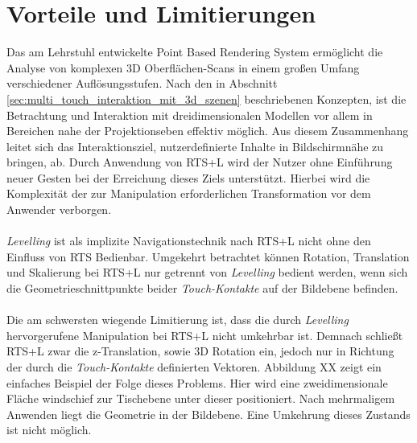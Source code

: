 \section{Vorteile und Limitierungen}
\label{sec:vorteile_und_limitierungen_implizit}

Das am Lehrstuhl entwickelte Point Based Rendering  System ermöglicht die Analyse von komplexen 3D Oberflächen-Scans in einem großen Umfang verschiedener Auflösungsstufen. Nach den in Abschnitt \ref{sec:multi_touch_interaktion_mit_3d_szenen} beschriebenen Konzepten, ist die Betrachtung und Interaktion mit dreidimensionalen Modellen vor allem in Bereichen nahe der Projektionseben effektiv möglich. Aus diesem Zusammenhang leitet sich das Interaktionsziel, nutzerdefinierte Inhalte in Bildschirmnähe zu bringen, ab. Durch Anwendung von RTS+L wird der Nutzer ohne Einführung neuer Gesten bei der Erreichung dieses Ziels unterstützt. Hierbei wird die Komplexität der zur Manipulation erforderlichen Transformation vor dem Anwender verborgen.
\\\\
\emph{Levelling} ist als implizite Navigationstechnik nach RTS+L nicht ohne den Einfluss von RTS Bedienbar. Umgekehrt betrachtet können Rotation, Translation und Skalierung bei RTS+L nur getrennt von \emph{Levelling} bedient werden, wenn sich die Geometrieschnittpunkte beider \emph{Touch-Kontakte} auf der Bildebene befinden. 
\\\\
Die am schwersten wiegende Limitierung ist, dass die durch \emph{Levelling} hervorgerufene Manipulation bei RTS+L nicht umkehrbar ist. Demnach schließt RTS+L zwar die z-Translation, sowie 3D Rotation ein, jedoch nur in Richtung der durch die \emph{Touch-Kontakte} definierten Vektoren. Abbildung XX zeigt ein einfaches Beispiel der Folge dieses Problems. Hier wird eine zweidimensionale Fläche windschief zur Tischebene unter dieser positioniert. Nach mehrmaligem Anwenden liegt die Geometrie in der Bildebene. Eine Umkehrung dieses Zustands ist nicht möglich.